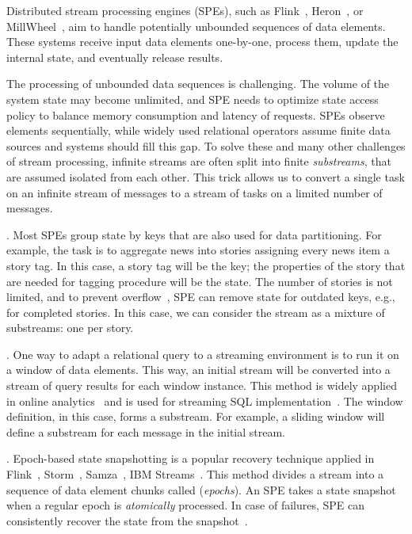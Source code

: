 \label {fs-acker-intro}

Distributed stream processing engines (SPEs), such as Flink~\cite{carbone2015apache}, Heron~\cite{Kulkarni:2015:THS:2723372.2742788}, or MillWheel~\cite{Akidau:2013:MFS:2536222.2536229}, aim to handle potentially unbounded sequences of data elements. These systems receive input data elements one-by-one, process them, update the internal state, and eventually release results. 

The processing of unbounded data sequences is challenging. The volume of the system state may become unlimited, and SPE needs to optimize state access policy to balance memory consumption and latency of requests. SPEs observe elements sequentially, while widely used relational operators assume finite data sources and systems should fill this gap. To solve these and many other challenges of stream processing, infinite streams are often split into finite {\em substreams}, that are assumed isolated from each other. This trick allows us to convert a single task on an infinite stream of messages to a stream of tasks on a limited number of messages.

. Most SPEs group state by keys that are also used for data partitioning. For example, the task is to aggregate news into stories assigning every news item a story tag. In this case, a story tag will be the key; the properties of the story that are needed for tagging procedure will be the state. The number of stories is not limited, and to prevent overflow~\cite{Tucker:2003:EPS:776752.776780}, SPE can remove state for outdated keys, e.g., for completed stories. In this case, we can consider the stream as a mixture of substreams: one per story.  

. One way to adapt a relational query to a streaming environment is to run it on a window of data elements. This way, an initial stream will be converted into a stream of query results for each window instance. This method is widely applied in online analytics~\cite{traub2018scotty} and is used for streaming SQL implementation~\cite{Begoli:2019:OSR:3299869.3314040}. The window definition, in this case, forms a substream. For example, a sliding window will define a substream for each message in the initial stream.

. Epoch-based state snapshotting is a popular recovery technique applied in Flink~\cite{Carbone:2017:SMA:3137765.3137777}, Storm~\cite{Toshniwal:2014:STO:2588555.2595641}, Samza~\cite{Noghabi:2017:SSS:3137765.3137770}, IBM Streams~\cite{jacques2016consistent}. This method divides a stream into a sequence of data element chunks called ({\em epochs}). An SPE takes a state snapshot when a regular epoch is {\em atomically} processed. In case of failures, SPE can consistently recover the state from the snapshot~\cite{2015arXiv150608603C}. 

